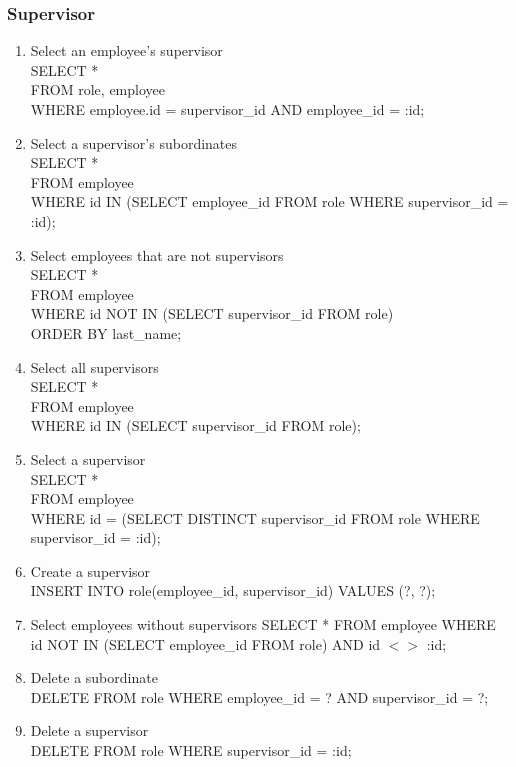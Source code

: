 \documentclass[11pt,letterpaper]{article}
\begin{document}
	\subsubsection{Supervisor}
	\begin{enumerate}
		\item Select an employee's supervisor\\SELECT * \\FROM role, employee \\WHERE employee.id = supervisor\_id AND employee\_id = :id;
		\item Select a supervisor's subordinates \\SELECT * \\FROM employee \\WHERE id IN (SELECT employee\_id FROM role WHERE supervisor\_id = :id);
		\item Select employees that are not supervisors \\SELECT * \\FROM employee \\WHERE id NOT IN (SELECT supervisor\_id FROM role) \\ORDER BY last\_name;
		\item Select all supervisors \\SELECT * \\FROM employee \\WHERE id IN (SELECT supervisor\_id FROM role);
		\item Select a supervisor\\SELECT * \\FROM employee \\WHERE id = (SELECT DISTINCT supervisor\_id FROM role WHERE supervisor\_id = :id);
		\item Create a supervisor \\INSERT INTO role(employee\_id, supervisor\_id) VALUES (?, ?);
		\item Select employees without supervisors SELECT * FROM employee WHERE id NOT IN (SELECT employee\_id FROM role) AND id $<$$>$ :id;
		\item Delete a subordinate \\DELETE FROM role WHERE employee\_id = ? AND supervisor\_id = ?;
		\item Delete a supervisor \\DELETE FROM role WHERE supervisor\_id = :id;
	\end{enumerate}
\end{document}
